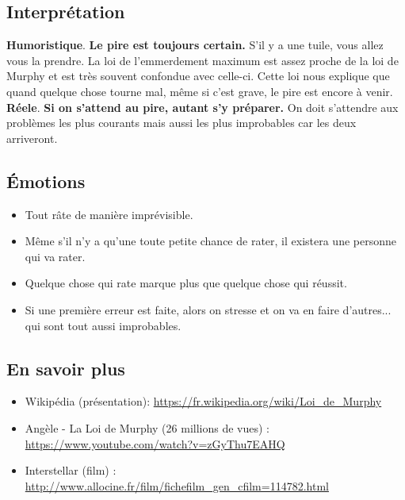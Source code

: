 \documentclass[11pt]{article}
\begin{document}
\begin{multicols}{2}
\subsection*{Interprétation}

\textbf{Humoristique}. \textbf{\og Le pire est toujours certain.\fg} S'il y a une tuile, vous allez vous la prendre. La \og loi de l’emmerdement maximum\fg \: est assez proche de la loi de Murphy et est très souvent confondue avec celle-ci. Cette loi nous explique que quand quelque chose tourne mal, même si c'est grave, le pire est encore à venir. \vspace{0.3cm} \\ 
\textbf{Réele}. \textbf{\og Si on s'attend au pire, autant s'y préparer.\fg} On doit s'attendre aux problèmes les plus courants mais aussi les plus improbables car les deux arriveront. 


\subsection*{Émotions}

\begin{itemize}
    \item Tout râte de manière imprévisible. 
    \item Même s'il n'y a qu'une toute petite chance de rater, il existera une personne qui va rater.  
    \item Quelque chose qui rate marque plus que quelque chose qui réussit. 
    \item Si une première erreur est faite, alors on stresse et on va en faire d'autres... qui sont tout aussi improbables.
\end{itemize}

\end{multicols}

\subsection*{En savoir plus}

\begin{itemize}
    \item Wikipédia (présentation): \url{https://fr.wikipedia.org/wiki/Loi_de_Murphy}
    \item Angèle - La Loi de Murphy (26 millions de vues) : \url{https://www.youtube.com/watch?v=zGyThu7EAHQ}
    \item Interstellar (film) : \url{http://www.allocine.fr/film/fichefilm_gen_cfilm=114782.html}
\end{itemize}
\end{document}

